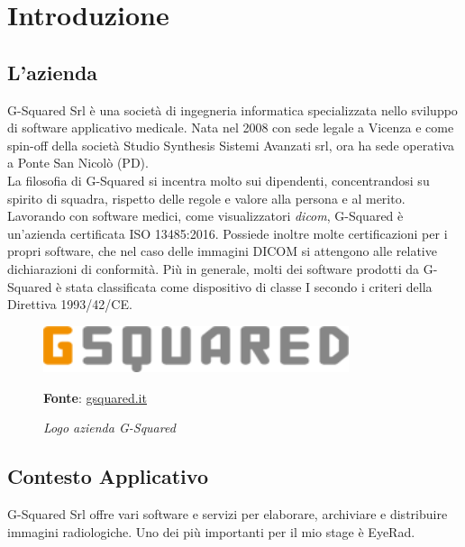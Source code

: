 
\chapter{Introduzione}
\label{cap:introduzione}

\section{L'azienda}

G-Squared Srl è una società di ingegneria informatica specializzata nello sviluppo di software applicativo medicale. Nata nel 2008 con sede legale a Vicenza e come spin-off della società Studio Synthesis Sistemi Avanzati srl, ora ha sede operativa a Ponte San Nicolò (PD).
\\
La filosofia di G-Squared si incentra molto sui dipendenti, concentrandosi su spirito di squadra, rispetto delle regole e valore alla persona e al merito.
\\
Lavorando con software medici, come visualizzatori \textit{\gls{dicom}}, G-Squared è un'azienda certificata ISO 13485:2016. Possiede inoltre molte certificazioni per i propri software, che nel caso delle immagini DICOM si attengono alle relative dichiarazioni di conformità. Più in generale, molti dei software prodotti da G-Squared è stata classificata come dispositivo di classe I secondo i criteri della Direttiva 1993/42/CE.

\begin{figure}[ht]
    \centering
    \includegraphics[width=0.8\textwidth]{immagini/logo-azienda.png}
    \caption{\textit{Logo azienda G-Squared}}
    \textbf{Fonte}: \href{https://www.gsquared.it/it}{gsquared.it}
    \label{fig: Logo azienda G-Squared}
\end{figure}

\newpage
\section{Contesto Applicativo}
G-Squared Srl offre vari software e servizi per elaborare, archiviare e distribuire immagini radiologiche. Uno dei più importanti per il mio stage è EyeRad.

